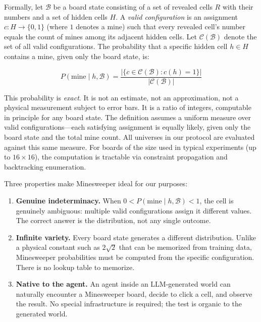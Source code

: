 \documentclass[12pt,a4paper]{article}
\begin{document}
Formally, let $\mathcal{B}$ be a board state consisting of a set of revealed cells $R$ with their numbers and a set of hidden cells $H$. A \emph{valid configuration} is an assignment $c: H \to \{0, 1\}$ (where $1$ denotes a mine) such that every revealed cell's number equals the count of mines among its adjacent hidden cells. Let $\mathcal{C}(\mathcal{B})$ denote the set of all valid configurations. The probability that a specific hidden cell $h \in H$ contains a mine, given only the board state, is:

\begin{equation}
P(\text{mine} \mid h, \mathcal{B}) = \frac{|\{c \in \mathcal{C}(\mathcal{B}) : c(h) = 1\}|}{|\mathcal{C}(\mathcal{B})|}
\label{eq:mine_prob}
\end{equation}

This probability is \emph{exact}. It is not an estimate, not an approximation, not a physical measurement subject to error bars. It is a ratio of integers, computable in principle for any board state. The definition assumes a uniform measure over valid configurations---each satisfying assignment is equally likely, given only the board state and the total mine count. All universes in our protocol are evaluated against this same measure. For boards of the size used in typical experiments (up to $16 \times 16$), the computation is tractable via constraint propagation and backtracking enumeration.

Three properties make Minesweeper ideal for our purposes:

\begin{enumerate}[nosep]
    \item \textbf{Genuine indeterminacy.} When $0 < P(\text{mine} \mid h, \mathcal{B}) < 1$, the cell is genuinely ambiguous: multiple valid configurations assign it different values. The correct answer is the distribution, not any single outcome.
    \item \textbf{Infinite variety.} Every board state generates a different distribution. Unlike a physical constant such as $2\sqrt{2}$ that can be memorized from training data, Minesweeper probabilities must be computed from the specific configuration. There is no lookup table to memorize.
    \item \textbf{Native to the agent.} An agent inside an LLM-generated world can naturally encounter a Minesweeper board, decide to click a cell, and observe the result. No special infrastructure is required; the test is organic to the generated world.
\end{enumerate}
\end{document}
